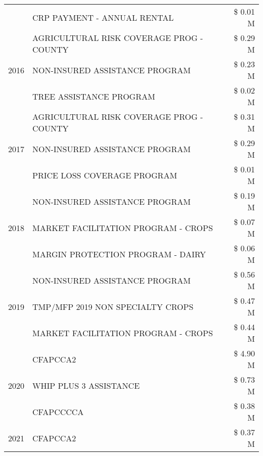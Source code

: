 \begin{tabular}{llr}
 & CRP PAYMENT - ANNUAL RENTAL & \$ 0.01 M \\
\cline{1-3}
\multirow[t]{3}{*}{2016} & AGRICULTURAL RISK COVERAGE PROG - COUNTY & \$ 0.29 M \\
 & NON-INSURED ASSISTANCE PROGRAM & \$ 0.23 M \\
 & TREE ASSISTANCE PROGRAM & \$ 0.02 M \\
\cline{1-3}
\multirow[t]{3}{*}{2017} & AGRICULTURAL RISK COVERAGE PROG - COUNTY & \$ 0.31 M \\
 & NON-INSURED ASSISTANCE PROGRAM & \$ 0.29 M \\
 & PRICE LOSS COVERAGE PROGRAM & \$ 0.01 M \\
\cline{1-3}
\multirow[t]{3}{*}{2018} & NON-INSURED ASSISTANCE PROGRAM & \$ 0.19 M \\
 & MARKET FACILITATION PROGRAM - CROPS & \$ 0.07 M \\
 & MARGIN PROTECTION PROGRAM - DAIRY & \$ 0.06 M \\
\cline{1-3}
\multirow[t]{3}{*}{2019} & NON-INSURED ASSISTANCE PROGRAM & \$ 0.56 M \\
 & TMP/MFP 2019 NON SPECIALTY CROPS & \$ 0.47 M \\
 & MARKET FACILITATION PROGRAM - CROPS & \$ 0.44 M \\
\cline{1-3}
\multirow[t]{3}{*}{2020} & CFAPCCA2 & \$ 4.90 M \\
 & WHIP PLUS 3 ASSISTANCE & \$ 0.73 M \\
 & CFAPCCCCA & \$ 0.38 M \\
\cline{1-3}
2021 & CFAPCCA2 & \$ 0.37 M \\
\cline{1-3}
\bottomrule
\end{tabular}
